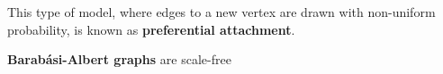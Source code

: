 This type of model, where edges to a new vertex are drawn with non-uniform
probability, is known as \textbf{preferential attachment}.

\begin{theorem}
  \textbf{Barab\'asi-Albert graphs} are scale-free
\end{theorem}



